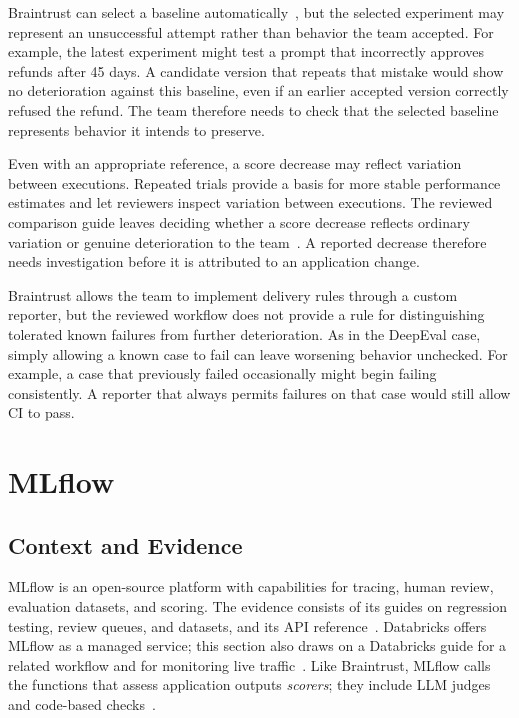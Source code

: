 Braintrust can select a baseline automatically~\parencite{Braintrust:Comparison},
but the selected experiment may represent an unsuccessful attempt rather than
behavior the team accepted. For example, the latest experiment might test a
prompt that incorrectly approves refunds after 45 days. A candidate version
that repeats that mistake would show no deterioration against this baseline,
even if an earlier accepted version correctly refused the refund. The team
therefore needs to check that the selected baseline represents behavior it
intends to preserve.

Even with an appropriate reference, a score decrease may reflect variation
between executions. Repeated trials provide a basis for more stable
performance estimates and let reviewers inspect variation between executions.
The reviewed comparison guide leaves deciding whether a score decrease reflects
ordinary variation or genuine deterioration to the
team~\parencite{Braintrust:Comparison}. A reported decrease therefore
needs investigation before it is attributed to an application change.

Braintrust allows the team to implement delivery rules through a custom
reporter, but the reviewed workflow does not provide a rule for distinguishing
tolerated known failures from further deterioration. As in the DeepEval case,
simply allowing a known case to fail can leave worsening behavior unchecked.
For example, a case that previously failed occasionally might begin failing
consistently. A reporter that always permits failures on that case would still
allow CI to pass.

\section{MLflow}
\label{sec:case-mlflow}

\subsection{Context and Evidence}

MLflow is an open-source platform with capabilities for tracing, human review,
evaluation datasets, and scoring. The evidence consists of its guides on
regression testing, review queues, and datasets, and its API
reference~\parencite{MLflow:RegressionGuide,MLflow:ReviewQueues,
MLflow:Datasets,MLflow:CompareEvaluations}. Databricks offers MLflow as a
managed service; this section also draws on a Databricks guide for a related
workflow and for monitoring live traffic~\parencite{Databricks:QualityLoop}.
Like Braintrust,
MLflow calls the functions that assess application outputs \emph{scorers};
they include LLM judges and code-based
checks~\parencite{MLflow:RegressionGuide}.


